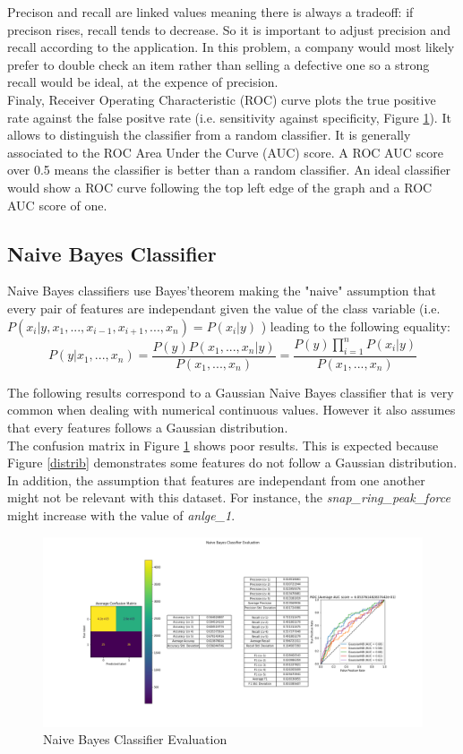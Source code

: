 Precison and recall are linked values meaning there is always a tradeoff: if
precison rises, recall tends to decrease. So it is important to adjust
precision and recall according to the application. In this problem, a company
would most likely prefer to double check an item rather than selling a
defective one so a strong recall would be ideal, at the expence of precision.\\

Finaly, Receiver Operating Characteristic (ROC) curve plots the true positive
rate against the false positve rate (i.e. sensitivity against specificity,
Figure \ref{nbc}). It allows to distinguish the classifier from a random
classifier. It is generally associated to the ROC Area Under the Curve (AUC)
score. A ROC AUC score over 0.5 means the classifier is better than a random
classifier. An ideal classifier would show a ROC curve following the top left
edge of the graph and a ROC AUC score of one.\\

\subsection{Naive Bayes Classifier}
Naive Bayes classifiers use Bayes'theorem making the "naive" assumption that
every pair of features are independant given the value of the class variable
\cite{nbc_scikit} (i.e. \(P(x_i | y, x_1,..., x_{i-1}, x_{i+1},..., x_n) =
P(x_i | y)\) ) leading to the following equality:
\[ P(y | x_1,..., x_n) = \frac{P(y)P(x_1,..., x_n | y)}{P(x_1,..., x_n)} =
    \frac{P(y)\prod_{i=1}^n P(x_i | y)}{P(x_1,..., x_n)} \]

The following results correspond to a Gaussian Naive Bayes \cite{nbcg_scikit}
classifier that is very common when dealing with numerical continuous values.
However it also assumes that every features follows a Gaussian distribution.\\

The confusion matrix in Figure \ref{nbc} shows poor results. This is expected
because Figure \ref{distrib} demonstrates some features do not follow a
Gaussian distribution. In addition, the assumption that features are
independant from one another might not be relevant with this dataset. For
instance, the \textit{snap\_ring\_peak\_force} might increase with the value of
\textit{anlge\_1}.

\begin{figure}
    \center
    \includegraphics[scale=0.32]{img/nbc_d.png}
    \caption{Naive Bayes Classifier Evaluation}
    \label{nbc}
\end{figure}


